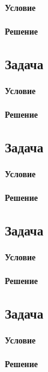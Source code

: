 \documentclass[12pt]{article}
\begin{document}
\paragraph{Условие}
\paragraph{Решение}

\subsection{Задача}
\label{task_}
\paragraph{Условие}
\paragraph{Решение}

\subsection{Задача}
\label{task_}
\paragraph{Условие}
\paragraph{Решение}

\subsection{Задача}
\label{task_}
\paragraph{Условие}
\paragraph{Решение}

\subsection{Задача}
\label{task_}
\paragraph{Условие}
\paragraph{Решение}
\end{document}
